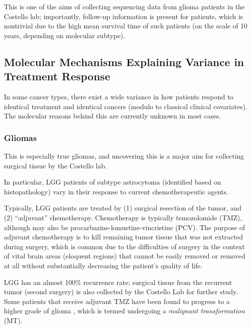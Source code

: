         This is one of the aims of collecting sequencing data from glioma patients in the
        Costello lab; importantly, follow-up information is present
        for patients, which is nontrivial due to the high mean
        survival time of such patients (on the scale of 10 years,
        depending on molecular subtype).

        \subsection{Molecular Mechanisms Explaining Variance in Treatment
          Response}

        In some cancer types, there exist a wide variance in how
        patients respond to identical treatment and identical cancers
        (modulo to classical clinical covariates). The molecular
        reasons behind this are currently unknown in most cases.

        \subsubsection{Gliomas}

        This is especially true gliomas, and uncovering this is a
        major aim for collecting surgical tissue by the Costello lab.

        In particular, LGG patients of subtype astrocytoma (identified
        based on histopathology) vary in their response to current
        chemotherapeutic agents.

        Typically, LGG patients are treated by (1) surgical resection
        of the tumor, and (2) ``adjuvant'' chemotherapy. Chemotherapy
        is typically temozolomide (TMZ), although may also be
        procarbazine-lomustine-vincristine (PCV). The purpose of adjuvant chemotherapy is to kill remaining tumor tissue
        that was not extracted during surgery, which is common due to
        the difficulties of surgery in the context of vital brain
        areas (eloquent regions) that cannot be easily removed or removed at all without
        substantially decreasing the patient's quality of life.

        LGG has an almost 100\% recurrence rate; surgical tissue
        from the recurrent tumor (second surgery) is also collected by the Costello Lab
        for further study. Some patients that receive adjuvant TMZ have been found to
       progress to a higher grade of glioma
       \cite{johnson_mutational_2014}, which is termed undergoing a
       \textit{malignant transformation} (MT).

